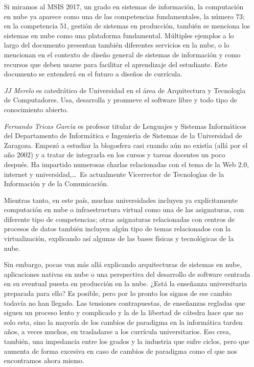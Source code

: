 \documentclass[twoside,10pt]{article}
\newcounter{num}
\begin{document}
\begin{multicols}{2}
Si miramos al MSIS 2017, un grado en sistemas de informaci\'on, la
computaci\'on en nube ya aparece como una de las competencias
fundamentales, la n\'umero 73; en la competencia 51, gesti\'on de
sistemas en producci\'on, tambi\'en se menciona los sistemas en nube como
una plataforma fundamental. M\'ultiples ejemplos a lo largo del
documento presentan tambi\'en diferentes servicios en la nube, o lo
mencionan en el contexto de dise\~no general de sistemas de
informaci\'on y como recursos que deben usarse para facilitar el
aprendizaje del estudiante. Este documento se extender\'a en el futuro a
dise\~nos de curr\'icula. 
  
\vspace{1ex} {\small{\begin{window} \noindent\emph{JJ Merelo} es catedr\'{a}tico de Universidad
en el \'area de Arquitectura y Tecnolog\'{\i}a de Computadores. Usa,
desarrolla y promueve el software libre y todo tipo de conocimiento
abierto. 
\end{window}}}

\medskip

{\small{\begin{window}
		\noindent \emph{Fernando Tricas Garc\'{\i}a} es profesor
		titular de Lenguajes y Sistemas Inform\'{a}ticos del Departamento
		de Inform\'{a}tica e Ingenier\'{\i}a de Sistemas de la Universidad de
		Zaragoza.  Empez\'{o} a estudiar la blogosfera casi cuando a\'{u}n no
		exist\'{\i}a (all\'{a} por el a\~{n}o 2002) y a tratar de integrarla en los
		cursos y tareas docentes un poco despu\'{e}s.  Ha impartido
		numerosas charlas relacionadas con el tema de la Web 2.0, 
		internet y universidad,\ldots\ 
		Es actualmente Vicerrector de Tecnolog\'{\i}as de la Informaci\'{o}n y
de la Comunicaci\'{o}n.   
		\end{window}}}

Mientras tanto, en este pa\'is, muchas universidades incluyen ya
expl\'icitamente computaci\'on en nube o infraestructura virtual como una
de las asignaturas, con diferente tipo de competencias; otras
asignaturas relacionadas con centros de procesos de datos tambi\'en
incluyen alg\'un tipo de temas relacionados con la virtualizaci\'on,
explicando as\'i algunas de las bases f\'isicas y tecnol\'ogicas de la
nube.

Sin embargo, pocas van m\'as all\'a explicando arquitecturas de sistemas
en nube, aplicaciones nativas en nube o una perspectiva del desarrollo
de software centrada en su eventual puesta en producci\'on en la nube. ¿Est\'a la ense\~nanza universitaria preparada para ello? Es posible, pero
por lo pronto los signos de ese cambio todav\'ia no han llegado. Las
tensiones contrapuestas, de ense\~nanzas regladas que siguen un proceso
lento y complicado y la de la libertad de c\'atedra hace que no solo
esta, sino la mayor\'ia de los cambios de paradigma en la inform\'atica
tarden a\~nos, a veces muchos, en trasladarse a los curr\'icula
universitarios. Eso crea, tambi\'en, una impedancia entre los grados y
la industria que sufre ciclos, pero que aumenta de forma excesiva en
caso de cambios de paradigma como el que nos encontramos ahora mismo.


\end{multicols}
\end{document}
